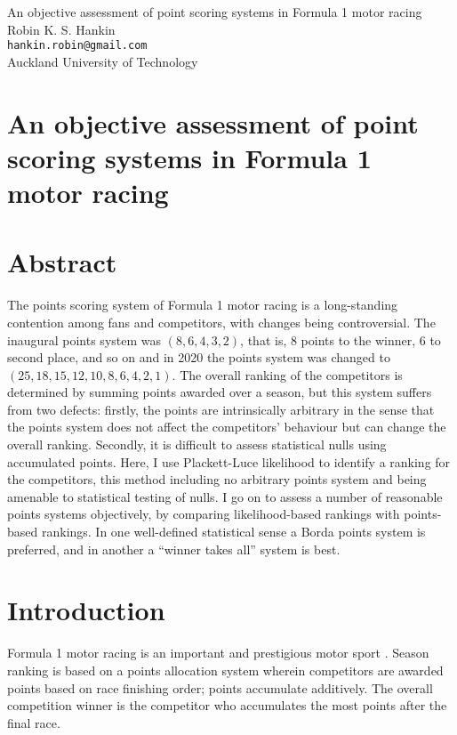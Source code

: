 \documentclass[a4,12pt]{article}
\begin{document}
\begin{titlepage}
  \begin{center}{\Large
      An objective assessment of point scoring systems in Formula 1 motor racing}\\
    Robin K. S. Hankin\\
{\tt hankin.robin@gmail.com}\\
Auckland University of Technology
\end{center}


\end{titlepage}

\newcommand{\raik}{R\"{a}ikk\"{o}nen}

\newpage
\section*{An objective assessment of point scoring systems in Formula 1 motor racing}
\section*{Abstract}
The points scoring system of Formula 1 motor racing is a long-standing
contention among fans and competitors, with changes being
controversial.  The inaugural points system was $(8,6,4,3,2)$, that
is, 8 points to the winner, 6 to second place, and so on and in 2020
the points system was changed to $(25,18,15,12,10,8,6,4,2,1)$.  The
overall ranking of the competitors is determined by summing points
awarded over a season, but this system suffers from two defects:
firstly, the points are intrinsically arbitrary in the sense that the
points system does not affect the competitors' behaviour but can
change the overall ranking.  Secondly, it is difficult to assess
statistical nulls using accumulated points.  Here, I use Plackett-Luce
likelihood to identify a ranking for the competitors, this method
including no arbitrary points system and being amenable to statistical
testing of nulls.  I go on to assess a number of reasonable points
systems objectively, by comparing likelihood-based rankings with
points-based rankings.  In one well-defined statistical sense a Borda
points system is preferred, and in another a ``winner takes all''
system is best.
\newpage

\section{\centering Introduction}\label{introduction}
Formula 1 motor racing is an important and prestigious motor sport
\citep{codling2017,jenkins2010}.  Season ranking is based on a points
allocation system wherein competitors are awarded points based on race
finishing order; points accumulate additively.  The overall
competition winner is the competitor who accumulates the most points
after the final race.
\end{document}
